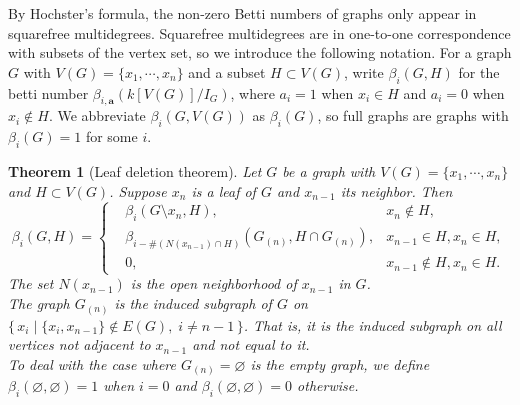 \documentclass[dvipsnames,10pt]{article}
\newtheorem{theorem}{Theorem}[section]
\begin{document}
By Hochster's formula, the non-zero Betti numbers of graphs only appear in squarefree multidegrees. Squarefree multidegrees are in one-to-one correspondence with subsets of the vertex set, so we introduce the following notation. For a graph $G$ with $V(G)=\{x_1,\cdots,x_n\}$ and a subset $H\subset V(G)$, write $\beta_i(G,H)$ for the betti number $\beta_{i,\mathbf{a}}(k[V(G)]/I_G)$, where $a_i=1$ when $x_i\in H$ and $a_i=0$ when $x_i\notin H$. We abbreviate $\beta_i(G,V(G))$ as $\beta_i(G)$, so full graphs are graphs with $\beta_i(G)=1$ for some $i$.

\begin{theorem}[Leaf deletion theorem]
    Let $G$ be a graph with $V(G)=\{x_1,\cdots,x_n\}$ and $H\subset V(G)$. Suppose $x_n$ is a leaf of $G$ and $x_{n-1}$ its neighbor. Then
    \begin{equation*}
        \beta_i(G,H) = \left\{
            \begin{aligned}
                &\beta_i(G\setminus x_n,H), &x_n\notin H,\\
                &\beta_{i-\#(N(x_{n-1})\cap H)}(G_{(n)},H\cap G_{(n)}), &x_{n-1}\in H,x_n\in H,\\
                &0, &x_{n-1}\notin H,x_n\in H.
            \end{aligned}
        \right.
    \end{equation*}
    The set $N(x_{n-1})$ is the open neighborhood of $x_{n-1}$ in $G$.\\
    The graph $G_{(n)}$ is the induced subgraph of $G$ on $\{\,x_i\mid \{x_i,x_{n-1}\}\notin E(G),\;i\neq n-1\,\}$. That is, it is the induced subgraph on all vertices not adjacent to $x_{n-1}$ and not equal to it.\\
    To deal with the case where $G_{(n)}=\varnothing$ is the empty graph, we define $\beta_i(\varnothing,\varnothing)=1$ when $i=0$ and $\beta_i(\varnothing,\varnothing)=0$ otherwise.
\end{theorem}
\end{document}
